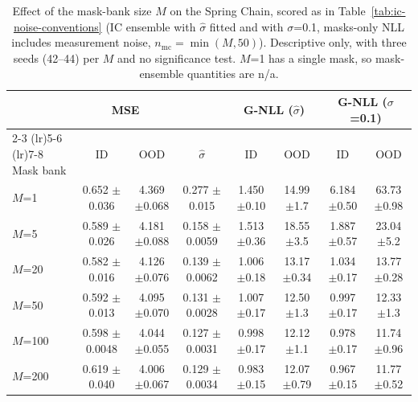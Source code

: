 \begin{table}[t]
\centering
\small
\setlength{\tabcolsep}{2.2pt}
\caption{Effect of the mask-bank size $M$ on the Spring Chain, scored as in Table~\ref{tab:ic-noise-conventions} (IC ensemble with $\hat\sigma$ fitted and with $\sigma$=0.1, masks-only NLL includes measurement noise, $n_\mathrm{mc}=\min(M,50)$). Descriptive only, with three seeds (42--44) per $M$ and no significance test. $M$=1 has a single mask, so mask-ensemble quantities are n/a.}
\label{tab:mask-bank-size}
\begin{tabular}{lccccccc}
\toprule
 & \multicolumn{2}{c}{MSE} &  & \multicolumn{2}{c}{G-NLL ($\hat\sigma$)} & \multicolumn{2}{c}{G-NLL ($\sigma$=0.1)} \\
\cmidrule(lr){2-3}
\cmidrule(lr){5-6}
\cmidrule(lr){7-8}
Mask bank & ID & OOD & $\hat\sigma$ & ID & OOD & ID & OOD \\
\midrule
$M$=1 & 0.652 {\footnotesize $\pm$0.036} & 4.369 {\footnotesize $\pm$0.068} & 0.277 {\footnotesize $\pm$0.015} & 1.450 {\footnotesize $\pm$0.10} & 14.99 {\footnotesize $\pm$1.7} & 6.184 {\footnotesize $\pm$0.50} & 63.73 {\footnotesize $\pm$0.98} \\
$M$=5 & 0.589 {\footnotesize $\pm$0.026} & 4.181 {\footnotesize $\pm$0.088} & 0.158 {\footnotesize $\pm$0.0059} & 1.513 {\footnotesize $\pm$0.36} & 18.55 {\footnotesize $\pm$3.5} & 1.887 {\footnotesize $\pm$0.57} & 23.04 {\footnotesize $\pm$5.2} \\
$M$=20 & 0.582 {\footnotesize $\pm$0.016} & 4.126 {\footnotesize $\pm$0.076} & 0.139 {\footnotesize $\pm$0.0062} & 1.006 {\footnotesize $\pm$0.18} & 13.17 {\footnotesize $\pm$0.34} & 1.034 {\footnotesize $\pm$0.17} & 13.77 {\footnotesize $\pm$0.28} \\
$M$=50 & 0.592 {\footnotesize $\pm$0.013} & 4.095 {\footnotesize $\pm$0.070} & 0.131 {\footnotesize $\pm$0.0028} & 1.007 {\footnotesize $\pm$0.17} & 12.50 {\footnotesize $\pm$1.3} & 0.997 {\footnotesize $\pm$0.17} & 12.33 {\footnotesize $\pm$1.3} \\
$M$=100 & 0.598 {\footnotesize $\pm$0.0048} & 4.044 {\footnotesize $\pm$0.055} & 0.127 {\footnotesize $\pm$0.0031} & 0.998 {\footnotesize $\pm$0.17} & 12.12 {\footnotesize $\pm$1.1} & 0.978 {\footnotesize $\pm$0.17} & 11.74 {\footnotesize $\pm$0.96} \\
$M$=200 & 0.619 {\footnotesize $\pm$0.040} & 4.006 {\footnotesize $\pm$0.067} & 0.129 {\footnotesize $\pm$0.0034} & 0.983 {\footnotesize $\pm$0.15} & 12.07 {\footnotesize $\pm$0.79} & 0.967 {\footnotesize $\pm$0.15} & 11.77 {\footnotesize $\pm$0.52} \\

\end{tabular}
\end{table}
